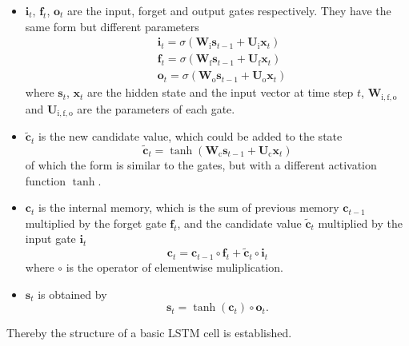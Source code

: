 \documentclass[10pt]{article}
\begin{document}
\begin{itemize}
\item $\mathbf{i}_t$, $\mathbf{f}_t$, $\mathbf{o}_t$ are the input, forget and output gates respectively. They have the same form but different parameters
\begin{align*}
& \mathbf{i}_t = \sigma\left(\mathbf{W}_{\text{i}}\mathbf{s}_{t-1} + \mathbf{U}_{\text{i}}\mathbf{x}_{t}\right) \\
& \mathbf{f}_t = \sigma\left(\mathbf{W}_{\text{f}}\mathbf{s}_{t-1} + \mathbf{U}_{\text{f}}\mathbf{x}_{t}\right) \\
& \mathbf{o}_t = \sigma\left(\mathbf{W}_{\text{o}}\mathbf{s}_{t-1} + \mathbf{U}_{\text{o}}\mathbf{x}_{t}\right)
\end{align*}
where $\mathbf{s}_t$, $\mathbf{x}_t$ are the hidden state and the input vector at time step $t$, $\mathbf{W}_{\text{i}, \text{f}, \text{o}}$ and $\mathbf{U}_{\text{i}, \text{f}, \text{o}}$ are the parameters of each gate.
\item $\tilde{\mathbf{c}}_t$ is the new candidate value, which could be added to the state
$$\tilde{\mathbf{c}}_t = \tanh\left(\mathbf{W}_{\text{c}}\mathbf{s}_{t-1} + \mathbf{U}_{\text{c}}\mathbf{x}_{t}\right)$$
of which the form is similar to the gates, but with a different activation function $\tanh$.
\item $\mathbf{c}_t$ is the internal memory, which is the sum of previous memory $\mathbf{c}_{t-1}$ multiplied by the forget gate $\mathbf{f}_t$, and the candidate value $\tilde{\mathbf{c}}_t$ multiplied by the input gate $\mathbf{i}_t$
$$\mathbf{c}_t = \mathbf{c}_{t-1} \circ \mathbf{f}_t + \tilde{\mathbf{c}}_t \circ \mathbf{i}_t$$
where $\circ$ is the operator of elementwise muliplication.
\item $\mathbf{s}_t$ is obtained by
$$\mathbf{s}_t = \tanh\left(\mathbf{c}_t\right) \circ \mathbf{o}_t\text{.}$$
\end{itemize}
Thereby the structure of a basic LSTM cell is established.
\end{document}
